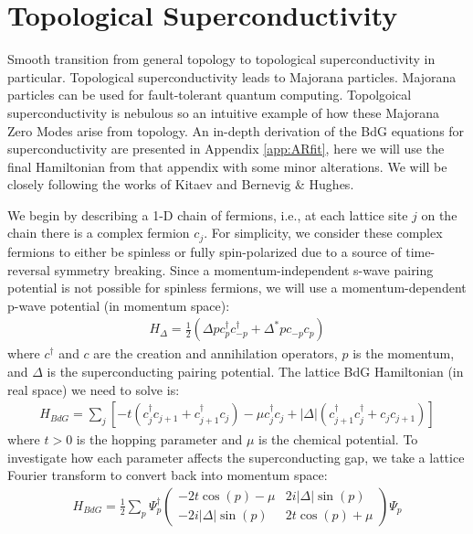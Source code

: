 \section{Topological Superconductivity}
Smooth transition from general topology to topological superconductivity in particular. Topological superconductivity leads to Majorana particles. Majorana particles can be used for fault-tolerant quantum computing. Topolgoical superconductivity is nebulous so an intuitive example of how these Majorana Zero Modes arise from topology.
An in-depth derivation of the \ac{BdG} equations for superconductivity are presented in Appendix \ref{app:ARfit}, here we will use the final Hamiltonian from that appendix with some minor alterations. We will be closely following the works of Kitaev and Bernevig \& Hughes\cite{Kitaev2001, bernevig_hughes_2013}.\par 
We begin by describing a 1-D chain of fermions, i.e., at each lattice site $j$ on the chain there is a complex fermion $c_{j}$. For simplicity, we consider these complex fermions to either be spinless or fully spin-polarized due to a source of time-reversal symmetry breaking. Since a momentum-independent s-wave pairing potential is not possible for spinless fermions, we will use a momentum-dependent p-wave potential (in momentum space):
\begin{align}
	H_{\Delta} = \frac{1}{2}\left(\Delta pc_{p}^{\dagger}c_{-p}^{\dagger}+\Delta^{*}pc_{-p}c_{p}\right)
\end{align}
where $c^{\dagger}$ and $c$ are the creation and annihilation operators, $p$ is the momentum, and $\Delta$ is the superconducting pairing potential. The lattice \ac{BdG} Hamiltonian (in real space) we need to solve is:
\begin{align}
	H_{BdG} = \sum_{j}\left[-t\left(c_{j}^{\dagger}c_{j+1}+c_{j+1}^{\dagger}c_{j}\right)-\mu c_{j}^{\dagger}c_{j}+|\Delta|\left(c_{j+1}^{\dagger}c_{j}^{\dagger}+c_{j}c_{j+1}\right)\right]
\end{align}
where $t>0$ is the hopping parameter and $\mu$ is the chemical potential. To investigate how each parameter affects the superconducting gap, we take a lattice Fourier transform to convert back into momentum space:
\begin{align}
	H_{BdG} = \frac{1}{2}\sum_{p}\Psi_{p}^{\dagger}
	\begin{pmatrix}
		-2t\cos(p)-\mu & 2i|\Delta|\sin(p)\\
		-2i|\Delta|\sin(p) & 2t\cos(p)+\mu
	\end{pmatrix}
	\Psi_{p}
\end{align}
